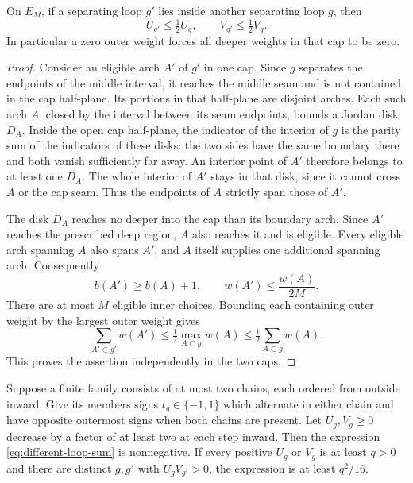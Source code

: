 \begin{lemma}
\label{lem:cap-weight-decrease}
On $E_M$, if a separating loop $g'$ lies inside another separating
loop $g$, then
\[
 U_{g'}\le\tfrac12 U_g,
 \qquad V_{g'}\le\tfrac12 V_g.
\]
In particular a zero outer weight forces all deeper weights in that
cap to be zero.
\end{lemma}

\begin{proof}
Consider an eligible arch $A'$ of $g'$ in one cap.  Since $g$ separates
the endpoints of the middle interval, it reaches the middle seam and
is not contained in the cap half-plane.  Its portions in that
half-plane are disjoint arches.  Each such arch $A$, closed by the
interval between its seam endpoints, bounds a Jordan disk $D_A$.
Inside the open cap half-plane, the indicator of the interior of $g$
is the parity sum of the indicators of these disks: the two sides
have the same boundary there and both vanish sufficiently far away.
An interior point of $A'$ therefore belongs to at least one $D_A$.
The whole interior of $A'$ stays in that disk, since it cannot cross
$A$ or the cap seam.  Thus the endpoints of $A$ strictly span those of
$A'$.

The disk $D_A$ reaches no deeper into the cap than its boundary arch.
Since $A'$ reaches the prescribed deep region, $A$ also reaches it and
is eligible.  Every eligible arch spanning $A$ also spans $A'$, and
$A$ itself supplies one additional spanning arch.  Consequently
\[
 b(A')\ge b(A)+1,
 \qquad w(A')\le\frac{w(A)}{2M}.
\]
There are at most $M$ eligible inner choices.  Bounding each containing
outer weight by the largest outer weight gives
\[
 \sum_{A'\subset g'}w(A')
 \le\tfrac12\max_{A\subset g}w(A)
 \le\tfrac12\sum_{A\subset g}w(A).
\]
This proves the assertion independently in the two caps.
\end{proof}

\begin{lemma}
\label{lem:two-chain-positivity}
Suppose a finite family consists of at most two chains, each ordered
from outside inward.  Give its members signs $t_g\in\{-1,1\}$ which
alternate in either chain and have opposite outermost signs when
both chains are present.  Let $U_g,V_g\ge0$ decrease by a factor of at
least two at each step inward.  Then the expression
\eqref{eq:different-loop-sum} is nonnegative.  If every positive $U_g$
or $V_g$ is at least $q>0$ and there are distinct $g,g'$ with $U_gV_{g'}>0$, the
expression is at least $q^2/16$.
\end{lemma}

